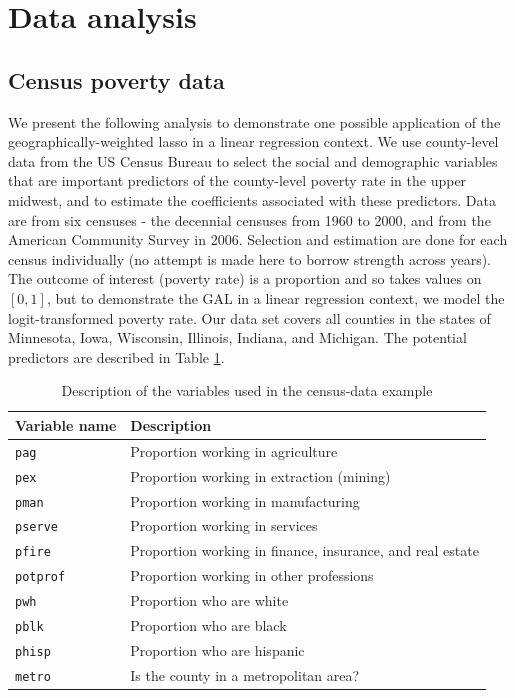 \documentclass[authoryear, review, 11pt]{elsarticle}
\begin{document}
			
\section{Data analysis}
	\subsection{Census poverty data}
	We present the following analysis to demonstrate one possible application of the geographically-weighted lasso in a linear regression context. We use county-level data from the US Census Bureau to select the social and demographic variables that are important predictors of the county-level poverty rate in the upper midwest, and to estimate the coefficients associated with these predictors. Data are from six censuses - the decennial censuses from 1960 to 2000, and from the American Community Survey in 2006. Selection and estimation are done for each census individually (no attempt is made here to borrow strength across years). The outcome of interest (poverty rate) is a proportion and so takes values on $[0,1]$, but to demonstrate the GAL in a linear regression context, we model the logit-transformed poverty rate. Our data set covers all counties in the states of Minnesota, Iowa, Wisconsin, Illinois, Indiana, and Michigan. The potential predictors are described in Table \ref{table:census-vars}.\\
	
	\begin{table}
		\begin{center}
		\begin{tabular}{ll}
			Variable name & Description \\
			\hline
			\verb!pag! & Proportion working in agriculture\\
			\verb!pex! &  Proportion working in extraction (mining)\\
			\verb!pman! & Proportion working in manufacturing \\
			\verb!pserve! & Proportion working in services \\
			\verb!pfire! & Proportion working in finance, insurance, and real estate \\
			\verb!potprof! & Proportion working in other professions \\
			\verb!pwh! & Proportion who are white \\
			\verb!pblk! & Proportion who are black \\
			\verb!phisp! & Proportion who are hispanic \\
			\verb!metro! & Is the county in a metropolitan area?\\
		\end{tabular}
		\caption{Description of the variables used in the census-data example\label{table:census-vars}}
		\end{center}		
	\end{table}
	
\end{document}

